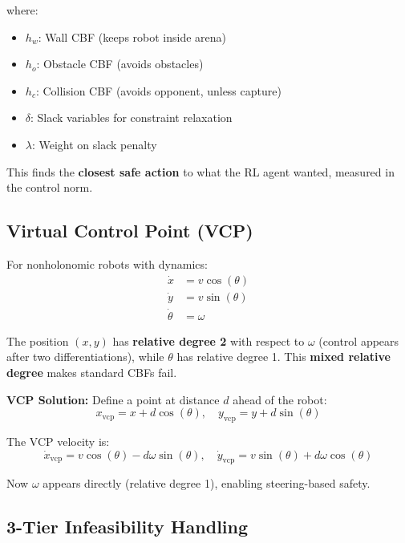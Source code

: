 \documentclass[11pt,a4paper]{report}
\begin{document}
where:
\begin{itemize}
    \item $h_w$: Wall CBF (keeps robot inside arena)
    \item $h_o$: Obstacle CBF (avoids obstacles)
    \item $h_c$: Collision CBF (avoids opponent, unless capture)
    \item $\delta$: Slack variables for constraint relaxation
    \item $\lambda$: Weight on slack penalty
\end{itemize}

This finds the \textbf{closest safe action} to what the RL agent wanted, measured in the control norm.

\subsection{Virtual Control Point (VCP)}

For nonholonomic robots with dynamics:
\begin{align}
    \dot{x} &= v \cos(\theta) \\
    \dot{y} &= v \sin(\theta) \\
    \dot{\theta} &= \omega
\end{align}

The position $(x,y)$ has \textbf{relative degree 2} with respect to $\omega$ (control appears after two differentiations), while $\theta$ has relative degree 1. This \textbf{mixed relative degree} makes standard CBFs fail.

\textbf{VCP Solution:} Define a point at distance $d$ ahead of the robot:
\begin{equation}
    x_{\text{vcp}} = x + d \cos(\theta), \quad y_{\text{vcp}} = y + d \sin(\theta)
\end{equation}

The VCP velocity is:
\begin{equation}
    \dot{x}_{\text{vcp}} = v \cos(\theta) - d \omega \sin(\theta), \quad \dot{y}_{\text{vcp}} = v \sin(\theta) + d \omega \cos(\theta)
\end{equation}

Now $\omega$ appears directly (relative degree 1), enabling steering-based safety.

\subsection{3-Tier Infeasibility Handling}
\end{document}
